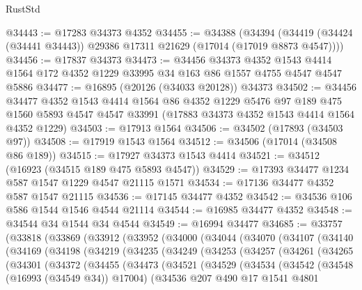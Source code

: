 \begin{lexlean}{RustStd}
\begin{coremodule}
@34443 := @17283 @34373 @4352
@34455 := @34388
    (@34394 (@34419 (@34424 (@34441 @34443)) @29386 @17311 @21629 (@17014 (@17019 @8873 @4547))))
@34456 := @17837 @34373
@34473 := @34456
    @34373
    @4352
    @1543
    @4414
    @1564
    @172
    @4352
    @1229
    @33995
    @34
    @163
    @86
    @1557
    @4755
    @4547
    @4547
    @5886
@34477 := @16895 (@20126 (@34033 @20128)) @34373
@34502 := @34456
    @34477
    @4352
    @1543
    @4414
    @1564
    @86
    @4352
    @1229
    @5476
    @97
    @189
    @475
    @1560
    @5893
    @4547
    @4547
    @33991
    (@17883 @34373 @4352 @1543 @4414 @1564 @4352 @1229)
@34503 := @17913 @1564
@34506 := @34502 (@17893 (@34503 @97))
@34508 := @17919 @1543 @1564
@34512 := @34506 (@17014 (@34508 @86 @189))
@34515 := @17927 @34373 @1543 @4414
@34521 := @34512 (@16923 (@34515 @189 @475 @5893 @4547))
@34529 := @17393 @34477 @1234 @587 @1547 @1229 @4547 @21115 @1571
@34534 := @17136 @34477 @4352 @587 @1547 @21115
@34536 := @17145 @34477 @4352
@34542 := @34536 @106 @586 @1544 @1546 @4544 @21114
@34544 := @16985 @34477 @4352
@34548 := @34544 @34 @1544 @34 @4544
@34549 := @16994 @34477
@34685 := @33757
    (@33818
      (@33869
        (@33912
          (@33952
            (@34000
              (@34044
                (@34070
                  (@34107
                    (@34140
                      (@34169
                        (@34198
                          (@34219
                            (@34235
                              (@34249
                                (@34253
                                  (@34257
                                    (@34261
                                      (@34265
                                        (@34301
                                          (@34372
                                            (@34455
                                              (@34473
                                                (@34521
                                                  (@34529
                                                    (@34534
                                                      (@34542
                                                        (@34548 (@16993 (@34549 @34)) @17004)
                                                        (@34536
                                                          @207
                                                          @490
                                                          @17
                                                          @1541
                                                          @4801

\end{coremodule}
\end{lexlean}
